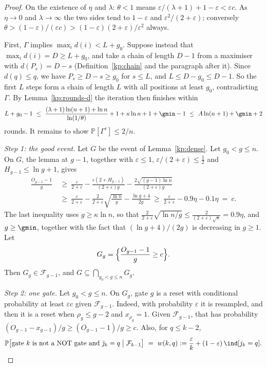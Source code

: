\documentclass[11pt]{amsart}
\theoremstyle{definition}
\theoremstyle{remark}
\newcommand{\eps}{\varepsilon}
\newcommand{\jt}{\tilde{\jmath}}
\newcommand{\PP}{\mathbb{P}}
\newcommand{\cF}{\mathcal{F}}
\begin{document}
\begin{proof}
On the existence of $\eta$ and $\lambda$: $\theta<1$ means
$\eps/(\lambda+1)+1-\eps<\eps c$. As $\eta\to 0$ and $\lambda\to\infty$ the two
sides tend to $1-\eps$ and $\eps^2/(2+\eps)$; conversely
$\theta>(1-\eps)/(\eps c)>(1-\eps)(2+\eps)/\eps^2$ always.

First, $\Gamma$ implies $\max_i d(i)<L+g_0$. Suppose instead that
$\max_i d(i)=D\ge L+g_0$, and take a chain of length $D-1$ from a maximiser
with $d(P_s)=D-s$ (Definition~\ref{kp:chain} and the paragraph after it).
Since $d(q)\le q$, we have $P_s\ge D-s\ge g_0$ for $s\le L$, and
$L\le D-g_0\le D-1$. So the first $L$ steps form a chain of length $L$ with all
positions at least $g_0$, contradicting $\Gamma$. By Lemma~\ref{kp:rounds-d} the
iteration then finishes within
\[
  L+g_0-1\ \le\ \frac{(\lambda+1)\ln(n+1)+\ln n}{\ln(1/\theta)}+1+\kappa\ln n+1+\gmin-1
  \ \le\ A\ln(n+1)+\gmin+2
\]
rounds. It remains to show $\PP[\Gamma^c]\le 2/n$.

\emph{Step 1: the good event.} Let $G$ be the event of Lemma~\ref{kp:dense}.
Let $g_0<g\le n$. On $G$, the lemma at $g-1$, together with $\eps\le 1$,
$\eps/(2+\eps)\le\frac12$ and $H_{g-1}\le\ln g+1$, gives
\begin{align*}
  \frac{O_{g-1}-1}{g}
  &\ \ge\ \frac{\eps}{2+\eps}-\frac{\eps(2+H_{g-1})}{(2+\eps)g}
       -\frac{2\sqrt{(g-1)\ln n}}{(2+\eps)g}\\
  &\ \ge\ \frac{\eps}{2+\eps}-\frac{2}{2+\eps}\sqrt{\frac{\ln n}{g}}
       -\frac{\ln g+4}{2g}
  \ \ge\ \frac{\eps}{2+\eps}-0.9\eta-0.1\eta\ =\ c.
\end{align*}
The last inequality uses $g\ge\kappa\ln n$, so that
$\frac{2}{2+\eps}\sqrt{\ln n/g}\le\frac{2}{(2+\eps)\sqrt\kappa}=0.9\eta$, and
$g\ge\gmin$, together with the fact that $(\ln g+4)/(2g)$ is decreasing in
$g\ge 1$. Let
\[
  G_g=\Bigl\{\frac{O_{g-1}-1}{g}\ge c\Bigr\}.
\]
Then $G_g\in\cF_{g-1}$, and $G\subseteq\bigcap_{g_0<g\le n}G_g$.

\emph{Step 2: one gate.} Let $g_0<g\le n$. On $G_g$, gate $g$ is a reset with
conditional probability at least $\eps c$ given $\cF_{g-1}$. Indeed, with
probability $\eps$ it is resampled, and then it is a reset when
$\rho_g\le g-2$ and $x_{\rho_g}=1$. Given $\cF_{g-1}$, that has probability
$(O_{g-1}-x_{g-1})/g\ge(O_{g-1}-1)/g\ge c$. Also, for $q\le k-2$,
\[
  \PP\bigl[\text{gate $k$ is not a NOT gate and $\jt_k=q$}\bigm|\cF_{k-1}\bigr]
  \ =\ w(k,q):=\frac{\eps}{k}+(1-\eps)\,\ind[j_k=q].
\]


\end{proof}
\end{document}
